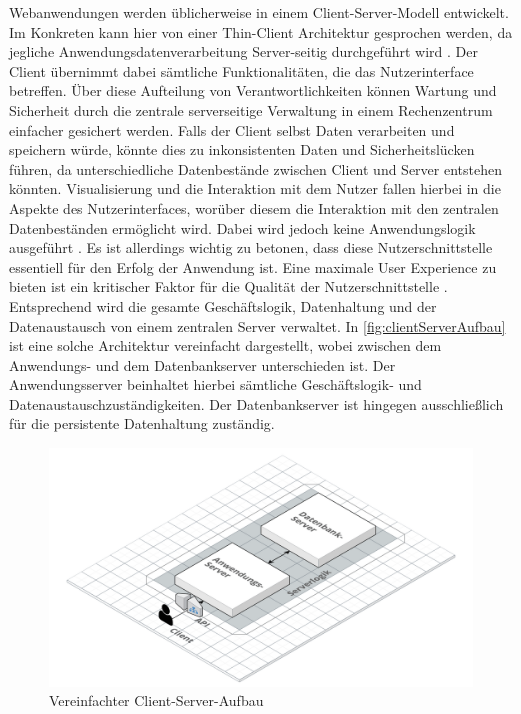 Webanwendungen werden üblicherweise in einem Client-Server-Modell entwickelt. Im Konkreten kann hier von einer Thin-Client Architektur gesprochen werden, da jegliche Anwendungsdatenverarbeitung Server-seitig durchgeführt wird \autocite{definitionOfThinClient}.
Der Client übernimmt dabei sämtliche Funktionalitäten, die das Nutzerinterface betreffen. Über diese Aufteilung von Verantwortlichkeiten können Wartung und Sicherheit durch die zentrale serverseitige Verwaltung in einem Rechenzentrum einfacher gesichert werden. Falls der Client selbst Daten verarbeiten und speichern würde, könnte dies zu inkonsistenten Daten und Sicherheitslücken führen, da unterschiedliche Datenbestände zwischen Client und Server entstehen könnten. 
Visualisierung und die Interaktion mit dem Nutzer fallen hierbei in die Aspekte des Nutzerinterfaces, worüber diesem die Interaktion mit den zentralen Datenbeständen ermöglicht wird. Dabei wird jedoch keine Anwendungslogik ausgeführt \autocite{thinClientArchitectureOverview}. Es ist allerdings wichtig zu betonen, dass diese Nutzerschnittstelle essentiell für den Erfolg der Anwendung ist. Eine maximale User Experience \autocite{definitionUserExperience} zu bieten ist ein kritischer Faktor für die Qualität der Nutzerschnittstelle \autocite{thinClientArchitectureOverview}.\\
Entsprechend wird die gesamte Geschäftslogik, Datenhaltung und der Datenaustausch von einem zentralen Server verwaltet. 
In \autoref{fig:clientServerAufbau} ist eine solche Architektur vereinfacht dargestellt, wobei zwischen dem Anwendungs- und dem Datenbankserver unterschieden ist. Der Anwendungsserver beinhaltet hierbei sämtliche Geschäftslogik- und Datenaustauschzuständigkeiten. Der Datenbankserver ist hingegen ausschließlich für die persistente Datenhaltung zuständig.

\begin{figure}[h]
    \centering
    \includegraphics[width=.9\textwidth]{img/ClientServer.png}
    \caption{Vereinfachter Client-Server-Aufbau}
    \label{fig:clientServerAufbau}
\end{figure}

